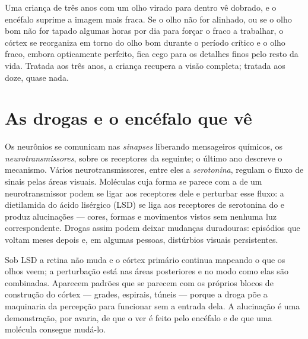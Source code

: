 \begin{example}\label{ex:g11:vision-and-brain:amblyopia}
Uma criança de três anos com um olho virado para dentro vê dobrado, e o
encéfalo suprime a imagem mais fraca. Se o olho não for alinhado, ou se
o olho bom não for tapado algumas horas por dia para forçar o fraco a
trabalhar, o córtex se reorganiza em torno do olho bom durante o
período crítico e o olho fraco, embora opticamente perfeito, fica cego
para os detalhes finos pelo resto da vida. Tratada aos três anos, a
criança recupera a visão completa; tratada aos doze, quase nada.
\end{example}

\section{As drogas e o encéfalo que vê}

\begin{proposition}\label{prop:g11:vision-and-brain:drugs}
Os neurônios se comunicam nas \emph{sinapses} liberando mensageiros
químicos, os \emph{neurotransmissores}, sobre os receptores da 
seguinte; o último ano descreve o mecanismo. Vários
neurotransmissores, entre eles a \emph{serotonina}, regulam o fluxo de
sinais pelas áreas visuais. Moléculas cuja forma se parece com a de um
neurotransmissor podem se ligar aos receptores dele e perturbar esse
fluxo: a dietilamida do ácido lisérgico (LSD) se liga aos receptores de
serotonina do  e produz alucinações --- cores, formas e
movimentos vistos sem nenhuma luz correspondente. Drogas assim podem
deixar mudanças duradouras: episódios que voltam meses depois e, em
algumas pessoas, distúrbios visuais persistentes.
\end{proposition}
\admitted

\begin{example}\label{ex:g11:vision-and-brain:hallucination}
Sob LSD a retina não muda e o córtex primário continua mapeando o que
os olhos veem; a perturbação está nas áreas posteriores e no modo como
elas são combinadas. Aparecem padrões que se parecem com os próprios
blocos de construção do córtex --- grades, espirais, túneis --- porque
a droga põe a maquinaria da percepção para funcionar sem a entrada
dela. A alucinação é uma demonstração, por avaria, de que o ver é feito
pelo encéfalo e de que uma molécula consegue mudá-lo.
\end{example}

